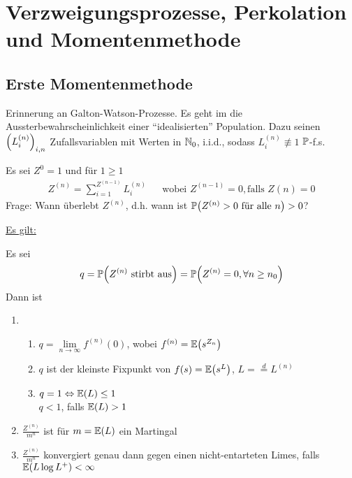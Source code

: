 
\chapter{Verzweigungsprozesse, Perkolation und Momentenmethode}

\section{Erste Momentenmethode}

Erinnerung an Galton-Watson-Prozesse. Es geht im die Aussterbewahrscheinlichkeit einer \enquote{idealisierten} Population. Dazu seinen $\left(L^{(n)}_i\right)_{i,n}$ Zufallsvariablen mit Werten in $\mathbb{N}_0$, i.i.d., sodass $L^{(n)}_i \not\equiv 1$ $\mathbb{P}$-f.s. 

Es sei $Z^0 = 1$ und für $1 \geq 1$
\begin{align}
	Z^{(n)} = \sum\limits_{i = 1}^{Z^{(n-1)}} L_i^{(n)} && \text{wobei } Z^{(n-1)} = 0, \text{falls } Z{(n)}  = 0
\end{align}
Frage: Wann überlebt $Z^{(n)}$, d.h. wann ist $\prop{Z^{(n)} > 0\text{ für alle }n} > 0$?

\underline{Es gilt:} \\
\begin{satz}
	Es sei 
	\begin{align}
		q = \propE{Z^{(n)} \text{ stirbt aus} } = \propE{Z^{(n)} = 0, \forall n \geq n_0}
	\end{align}
	Dann ist 
	\begin{enumerate}[a]
	
		\item
			\begin{enumerate}
				\item $q = \lim\limits_{n \to \infty} f^{(n)}(0)$, wobei $f^{(n)} = \EW{s^{Z_n}}$
				\item $q$ ist der kleinste Fixpunkt von $f(s) = \EW{s^L}$, $L = \overset{d}{=} L^(n)$
				\item $q = 1 \Leftrightarrow \EW{L} \leq 1$ \\ $q<1$, falls $\EW{L} > 1$
			\end{enumerate}
		\item $\frac{Z^{(n)}}{m^n}$  ist für $m = \EW{L}$ ein Martingal
		\item $\frac{Z^{(n)}}{m^n}$ konvergiert genau dann gegen einen nicht-entarteten Limes, falls $\EW{L \log L^+} < \infty$
	\end{enumerate}
\end{satz}

